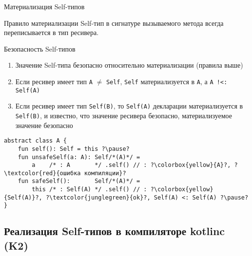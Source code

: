 \documentclass[aspectratio=169,usenames,dvipsnames]{beamer}
\begin{document}
    \begin{frame}[fragile]{Материализация Self-типов}
        \begin{block}{Правило материализации}
            Self-тип в сигнатуре вызываемого метода всегда переписывается в тип ресивера.
        \end{block}
        \pause
        \begin{block}{Безопасность Self-типов}
            \begin{enumerate}
                \item Значение Self-типа безопасно относительно материализации (правила выше)
                \item Если ресивер имеет тип \texttt{A} $\neq$ \texttt{Self}, \texttt{Self} материализуется в \texttt{A}, а \texttt{A !<: Self(A)}
                \item Если ресивер имеет тип \texttt{Self(B)}, то \texttt{Self(A)} декларации материализуется в \texttt{Self(B)}, и известно, что значение ресивера безопасно, материализуемое значение безопасно
            \end{enumerate} \pause
            \begin{verbatim}
abstract class A {
    fun self(): Self = this ?\pause?
    fun unsafeSelf(a: A): Self/*(A)*/ =
        a    /* : A       */ .self() // : ?\colorbox{yellow}{A}?, ?\textcolor{red}{ошибка компиляции}?
    fun safeSelf():       Self/*(A)*/ =
        this /* : Self(A) */ .self() // : ?\colorbox{yellow}{Self(A)}?, ?\textcolor{junglegreen}{ok}?, Self(A) <: Self(A) ?\pause?
}
            \end{verbatim}
        \end{block}
    \end{frame}

    \subsection{Реализация Self-типов в компиляторе kotlinc (K2)}
\end{document}
